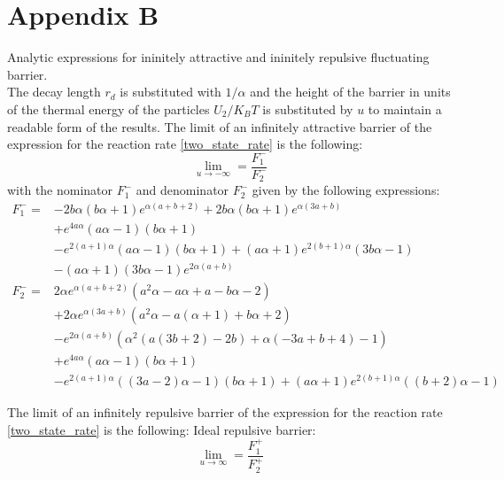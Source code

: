 \section{Appendix B}
Analytic expressions for ininitely attractive and ininitely repulsive fluctuating barrier. \\
The decay length $r_d$ is substituted with $1/\alpha$ and the height of the barrier in units of the thermal energy of the particles $U_2/K_B T$ is substituted by $u$ to maintain a readable form of the results.
The limit of an infinitely attractive barrier of the expression for the reaction rate \eqref{two_state_rate} is the following:
\begin{equation}
    \lim_{u \rightarrow - \infty} = \frac{F_{1}^{-}}{F_{2}^{-}}
    \label{attractive_limit}
\end{equation}
with the nominator $F_1^-$ and denominator $F_2^-$ given by the following expressions:
\begin{align}
    F_1^- = &-2 b \alpha (b \alpha+1) e^{\alpha (a+b+2)}+2 b \alpha (b \alpha+1) e^{\alpha (3 a+b)} \nonumber \\
            &+e^{4 a \alpha} (a \alpha-1) (b \alpha+1) \nonumber \\
            &-e^{2 (a+1) \alpha} (a \alpha-1) (b \alpha+1)+(a \alpha+1) e^{2 (b+1) \alpha} (3 b \alpha-1) \nonumber \\
            &-(a \alpha+1) (3 b \alpha-1) e^{2 \alpha (a+b)} \\
    F_2^- = & 2 \alpha e^{\alpha (a+b+2)} \left(a^2 \alpha-a \alpha+a-b \alpha-2\right) \nonumber \\
            &+2 \alpha e^{\alpha (3 a+b)} \left(a^2 \alpha-a (\alpha+1)+b \alpha+2\right) \nonumber \\
            &-e^{2 \alpha (a+b)} \left(\alpha^2 (a (3 b+2)-2 b)+\alpha (-3 a+b+4)-1\right) \nonumber \\
            &+e^{4 a \alpha} (a \alpha-1) (b \alpha+1) \nonumber \\
            &-e^{2 (a+1) \alpha} ((3 a-2) \alpha-1) (b \alpha+1)+(a \alpha+1) e^{2 (b+1) \alpha} ((b+2) \alpha-1)
\end{align}

The limit of an infinitely repulsive barrier of the expression for the reaction rate \eqref{two_state_rate} is the following:
Ideal repulsive barrier:
\begin{equation}
    \lim_{u \rightarrow \infty} = \frac{F_1^+}{F_2^+}
    \label{repulsive_limit}
\end{equation}

